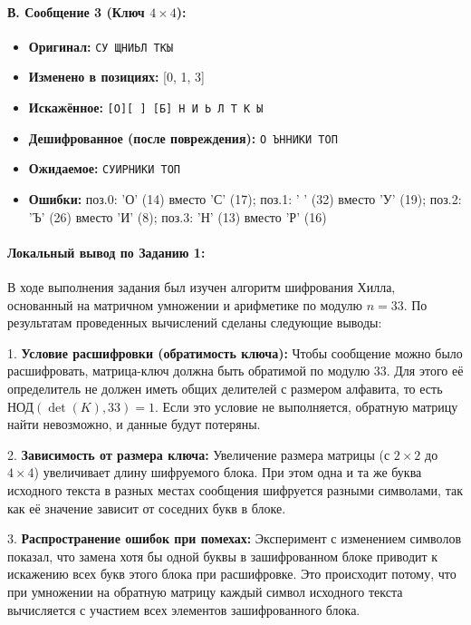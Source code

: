 \paragraph{В. Сообщение 3 (Ключ $4\times4$):}
\begin{itemize}
    \item \textbf{Оригинал:} \texttt{СУ ЩНИЬЛ ТКЫ}
    \item \textbf{Изменено в позициях:} [0, 1, 3]
    \item \textbf{Искажённое:} \texttt{[О][ ]   [Б] Н И Ь Л   Т К Ы}
    \item \textbf{Дешифрованное (после повреждения):} \texttt{О ЪННИКИ ТОП}
    \item \textbf{Ожидаемое:} \texttt{СУИРНИКИ ТОП}
    \item \textbf{Ошибки:} поз.0: 'О' (14) вместо 'С' (17); поз.1: ' ' (32) вместо 'У' (19); поз.2: 'Ъ' (26) вместо 'И' (8); поз.3: 'Н' (13) вместо 'Р' (16)
\end{itemize}

\paragraph{Локальный вывод по Заданию 1:}
В ходе выполнения задания был изучен алгоритм шифрования Хилла, основанный на матричном умножении и арифметике по модулю $n = 33$. По результатам проведенных вычислений сделаны следующие выводы:

1. \textbf{Условие расшифровки (обратимость ключа):} Чтобы сообщение можно было расшифровать, матрица-ключ должна быть обратимой по модулю 33. Для этого её определитель не должен иметь общих делителей с размером алфавита, то есть $\text{НОД}(\det(K), 33) = 1$. Если это условие не выполняется, обратную матрицу найти невозможно, и данные будут потеряны.

2. \textbf{Зависимость от размера ключа:} Увеличение размера матрицы (с $2\times2$ до $4\times4$) увеличивает длину шифруемого блока. При этом одна и та же буква исходного текста в разных местах сообщения шифруется разными символами, так как её значение зависит от соседних букв в блоке.

3. \textbf{Распространение ошибок при помехах:} Эксперимент с изменением символов показал, что замена хотя бы одной буквы в зашифрованном блоке приводит к искажению всех букв этого блока при расшифровке. Это происходит потому, что при умножении на обратную матрицу каждый символ исходного текста вычисляется с участием всех элементов зашифрованного блока.